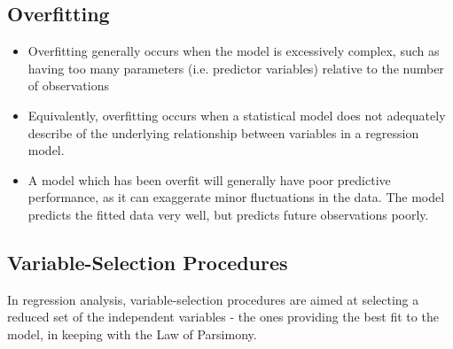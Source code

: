\subsection*{Overfitting}
\begin{itemize}
\item Overfitting generally occurs when the model is excessively complex, such as having too many parameters (i.e. predictor variables) relative to the number of observations

\item Equivalently, overfitting occurs when a statistical model does not adequately describe of the underlying relationship between variables in a regression model.

\item A model which has been overfit will generally have poor predictive performance, as it can exaggerate minor fluctuations in the data. The model predicts the fitted data very well, but predicts future observations poorly.

\end{itemize}


\subsection*{Variable-Selection Procedures}

In regression analysis, variable-selection procedures are aimed at selecting a reduced set of the independent variables - the ones providing the best fit to the model, in keeping with the Law of Parsimony.








